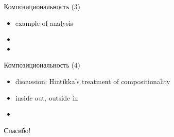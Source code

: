 \documentclass{beamer}
\begin{document}
\begin{frame}{Композициональность (3)}
\begin{itemize}
	\item example of analysis
	\item 
	\item 
\end{itemize}
\end{frame}

\begin{frame}{Композициональность (4)}
\begin{itemize}
	\item discussion: Hintikka's treatment of compositionality
	\item inside out, outside in
	\item 
\end{itemize}
\end{frame}


\begin{frame}{}
    \thispagestyle{empty}
    \begin{center}
        {\large Спасибо!}
    \end{center}
\end{frame}


\end{document}
